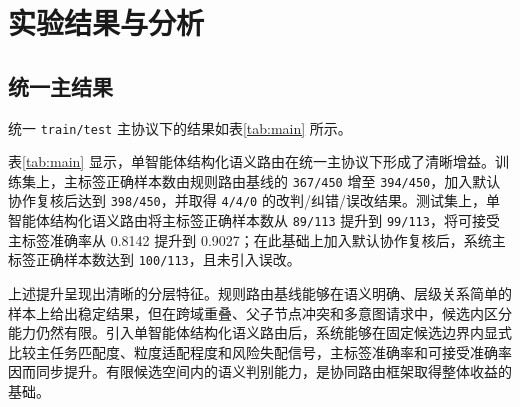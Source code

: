 \documentclass[10pt,a4paper,twocolumn,fontset=fandol]{ctexart}
\begin{document}
\section{实验结果与分析}

\subsection{统一主结果}

统一 \texttt{train/test} 主协议下的结果如表\ref{tab:main} 所示。

\begin{table}[htbp]
\centering
\caption{统一 \texttt{train/test} 主协议下的主标签结果}
\label{tab:main}
\small
\setlength{\tabcolsep}{3.8pt}
\end{table}

表\ref{tab:main} 显示，单智能体结构化语义路由在统一主协议下形成了清晰增益。训练集上，主标签正确样本数由规则路由基线的 \texttt{367/450} 增至 \texttt{394/450}，加入默认协作复核后达到 \texttt{398/450}，并取得 \texttt{4/4/0} 的改判/纠错/误改结果。测试集上，单智能体结构化语义路由将主标签正确样本数从 \texttt{89/113} 提升到 \texttt{99/113}，将可接受主标签准确率从 0.8142 提升到 0.9027；在此基础上加入默认协作复核后，系统主标签正确样本数达到 \texttt{100/113}，且未引入误改。

上述提升呈现出清晰的分层特征。规则路由基线能够在语义明确、层级关系简单的样本上给出稳定结果，但在跨域重叠、父子节点冲突和多意图请求中，候选内区分能力仍然有限。引入单智能体结构化语义路由后，系统能够在固定候选边界内显式比较主任务匹配度、粒度适配程度和风险失配信号，主标签准确率和可接受准确率因而同步提升。有限候选空间内的语义判别能力，是协同路由框架取得整体收益的基础。
\end{document}
